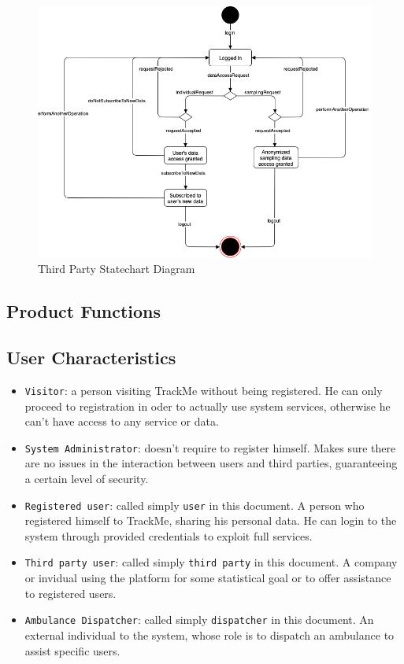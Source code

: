 \documentclass[12pt,a4paper]{article}
\begin{document}
		\begin{figure}[H]
			\includegraphics[width=1.0\linewidth]{Images/statechart_third_party}
			\caption{Third Party Statechart Diagram}
			\label{fig:statechart_third_party}
		\end{figure}
	
	\newpage
	\subsection{Product Functions}
	
	\subsection{User Characteristics}
		\begin{itemize}
			\item \texttt{Visitor}: a person visiting TrackMe without being registered. He can only proceed to registration in oder to actually use system services, otherwise he can't have access to any service or data.
			\item \texttt{System Administrator}: doesn't require to register himself. Makes sure there are no issues in the interaction between users and third parties, guaranteeing a certain level of security.
			\item \texttt{Registered user}: called simply \texttt{user} in this document. A person who registered himself to TrackMe, sharing his personal data. He can login to the system through provided credentials to exploit full services.
			\item \texttt{Third party user}: called simply \texttt{third party} in this document. A company or invidual using the platform for some statistical goal or to offer assistance to registered users.
			\item \texttt{Ambulance Dispatcher}: called simply \texttt{dispatcher} in this document. An external individual to the system, whose role is to dispatch an ambulance to assist specific users.
		\end{itemize}
	
\end{document}
